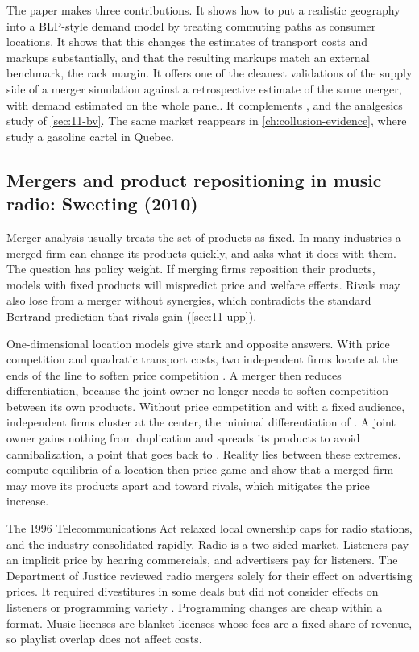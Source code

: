 The paper makes three contributions. It shows how to put a realistic geography into a BLP-style demand model by
treating commuting paths as consumer locations. It shows that this changes the estimates of transport costs and
markups substantially, and that the resulting markups match an external benchmark, the rack margin. It offers one of
the cleanest validations of the supply side of a merger simulation against a retrospective estimate of the same
merger, with demand estimated on the whole panel. It complements
\citet{Peters2006}, \citet{WeinbergHosken2013} and the analgesics study of \cref{sec:11-bv}. The same market reappears
in \cref{ch:collusion-evidence}, where \citet{ClarkHoude2013} study a gasoline cartel in Quebec.

\subsection{Mergers and product repositioning in music radio: Sweeting (2010)}\label{sec:11-sweeting}

Merger analysis usually treats the set of products as fixed. In many industries a merged firm can change its products
quickly, and \citet{Sweeting2010} asks what it does with them. The question has policy weight. If merging firms
reposition their products, models with fixed products will mispredict price and welfare effects. Rivals may also lose
from a merger without synergies, which contradicts the standard Bertrand prediction that rivals gain
(\cref{sec:11-upp}).

One-dimensional location models give stark and opposite answers. With price competition and quadratic transport
costs, two independent firms locate at the ends of the line to soften price competition
\citep{DAspremontGabszewiczThisse1979}. A merger then reduces differentiation, because the joint owner no longer needs
to soften competition between its own products. Without price competition and with a fixed audience, independent
firms cluster at the center, the minimal differentiation of \citet{Hotelling1929}. A joint owner gains nothing from
duplication and spreads its products to avoid cannibalization, a point that goes back to \citet{Steiner1952}. Reality
lies between these extremes. \citet{GandhiEtAl2008} compute equilibria of a location-then-price game and show that a
merged firm may move its products apart and toward rivals, which mitigates the price increase.

The 1996 Telecommunications Act relaxed local ownership caps for radio stations, and the industry consolidated
rapidly. Radio is a two-sided market. Listeners pay an implicit price by hearing commercials, and advertisers pay for
listeners. The Department of Justice reviewed radio mergers solely for their effect on advertising prices. It
required divestitures in some deals but did not consider effects on listeners or programming variety
\citep[p.~8]{Sweeting2010}. Programming changes are cheap within a format. Music licenses are blanket licenses whose
fees are a fixed share of revenue, so playlist overlap does not affect costs.

